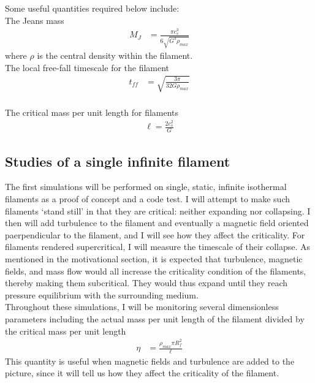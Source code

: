 \documentclass[a4paper,12pt]{article}
\begin{document}

Some useful quantities required below include:\\

The Jeans mass
\begin{align*}
M_J &= \frac{\pi c_s^3}{6\sqrt{G^3\rho_{max}}}
\end{align*} where $\rho$ is the central density within the filament.\\

The local free-fall timescale for the filament
\begin{align*}
t_{ff} &= \sqrt{\frac{3\pi }{32G\rho_{max}}}
\end{align*}\\

The critical mass per unit length for filaments
\begin{align*}
\ell=\frac{2c_s^2}{G}
\end{align*}

\subsection{Studies of a single infinite filament}

The first simulations will be performed on single, static, infinite isothermal filaments as a proof of concept and a code test. I will attempt to make such filaments `stand still' in that they are critical: neither expanding nor collapsing.  I then will add turbulence to the filament and eventually a magnetic field oriented paerpendicular to the filament, and I will see how they affect the criticality. For filaments rendered supercritical, I will measure the timescale of their collapse. As mentioned in the motivational section, it is expected that turbulence, magnetic fields, and mass flow would all increase the criticality condition of the filaments, thereby making them subcritical. They would thus expand until they reach pressure equilibrium with the surrounding medium.\\

Throughout these simulations, I will be monitoring several dimensionless parameters including the actual mass per unit length of the filament divided by the critical mass per unit length
\begin{align}
\eta &=\frac{\rho_{max}\pi R_f^2}{\ell}
\end{align} This quantity is useful when magnetic fields and turbulence are added to the picture, since it will tell us how they affect the criticality of the filament.\\
\end{document}
